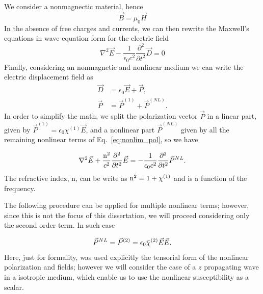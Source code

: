 We consider a nonmagnectic material, hence
\begin{equation}
    \vec{B} = \mu_0 \vec{H}
\end{equation}
%
In the absence of free charges and currents, we can then rewrite the Maxwell's equations in wave equation form for the electric field 
\begin{equation}
    \nabla^2\vec{E} - \frac{1}{\epsilon_0 c^2}\frac{\partial^2}{\partial t^2}\vec{D} = 0
\end{equation}
Finally, considering an nonmagnetic and nonlinear medium we can write the electric displacement field as
\begin{subequations}
    \begin{align}
        \vec{D} &= \epsilon_0\vec{E} +\vec{P},\\
        \vec{P} &= \vec{P}^{(1)} + \vec{P}^{(NL)}.
    \end{align}
\end{subequations}
In order to simplify the math, we split the polarization vector $\vec{P}$ in a linear part, given by $\vec{P}^{(1)} = \epsilon_0\chi^{(1)}\vec{E}$, and a nonlinear part $\vec{P}^{(NL)}$ given by all the remaining nonlinear terms of Eq.~\ref{eq:nonlim_pol}, so we have

\begin{equation}
    \nabla^2\vec{E} +\frac{\text{n}^2}{c^2}\frac{\partial^2}{\partial t^2}\vec{E} = -\frac{1}{\epsilon_0 c^2} \frac{\partial^2}{\partial t^2}\vec{P}^{NL}.
    \label{eq:wave_equation_nonlinear}
\end{equation}
The refractive index, n, can be write as $\text{n}^2= 1 + \chi^{(1)}$ and is a function of the frequency.

The following procedure can be applied for multiple nonlinear terms; however, since this is not the focus of this dissertation, we will proceed considering only the second order term. In such case

\begin{equation}
    \vec{P}^{NL} = \vec{P}^{(2)} = \epsilon_0\Bar{\chi}^{(2)}\vec{E}\vec{E}.
    \label{eq:nonlinear_polarization}
\end{equation}
Here, just for formality, was used explicitly the tensorial form of the nonlinear polarization and fields; however we will consider the case of a $z$ propagating wave in a isotropic medium, which enable us to use the nonlinear susceptibility as a scalar.

